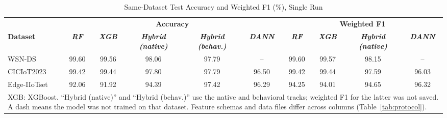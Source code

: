 \documentclass[conference]{IEEEtran}
\begin{document}
\begin{table}[t]
\caption{Same-Dataset Test Accuracy and Weighted F1 (\%), Single Run}
\label{tab:same}
\centering
\footnotesize
\setlength{\tabcolsep}{5pt}
\begin{tabular}{|l|c|c|c|c|c|c|c|c|c|}
\hline
 & \multicolumn{5}{c|}{\textbf{Accuracy}} & \multicolumn{4}{c|}{\textbf{Weighted F1}} \\
\cline{2-10}
\textbf{Dataset} & \textbf{\textit{RF}} & \textbf{\textit{XGB}} & \textbf{\textit{Hybrid (native)}} & \textbf{\textit{Hybrid (behav.)}} & \textbf{\textit{DANN}} & \textbf{\textit{RF}} & \textbf{\textit{XGB}} & \textbf{\textit{Hybrid (native)}} & \textbf{\textit{DANN}} \\
\hline
WSN-DS & 99.60 & 99.56 & 98.06 & 97.79 & -- & 99.60 & 99.57 & 98.15 & -- \\
\hline
CICIoT2023 & 99.42 & 99.44 & 97.80 & 97.79 & 96.50 & 99.42 & 99.44 & 97.59 & 96.03 \\
\hline
Edge-IIoTset & 92.06 & 91.92 & 94.39 & 97.42 & 96.29 & 94.25 & 94.01 & 94.65 & 96.32 \\
\hline
\multicolumn{10}{p{404pt}}{XGB: XGBoost. ``Hybrid (native)'' and ``Hybrid (behav.)'' use the native and behavioral tracks; weighted F1 for the latter was not saved. A dash means the model was not trained on that dataset. Feature schemas and data files differ across columns (Table~\ref{tab:protocol}).}
\end{tabular}
\end{table}
\end{document}
